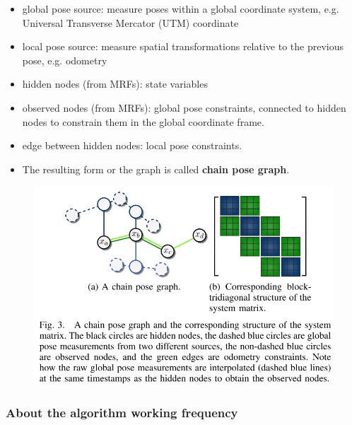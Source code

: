 \documentclass[letterpaper,10pt]{article}
\begin{document}
\begin{itemize}
	\item global pose source: measure poses within a global coordinate system, e.g. Universal Transverse Mercator (UTM) coordinate
	\item local pose source:  measure spatial transformations relative to the previous pose, e.g. odometry
	\item hidden nodes (from MRFs): state variables
	\item observed nodes (from MRFs): global pose constraints, connected to hidden nodes to constrain them in the global coordinate frame.
	\item edge between hidden nodes: local pose constraints.
	\item The resulting form or the graph is called \textbf{chain pose graph}.
\end{itemize}

\begin{figure}[!ht]
	\centering
	\includegraphics[width=15cm]{./img/posegraph.png}
\end{figure}

\subsubsection{About the algorithm working frequency}
\end{document}

